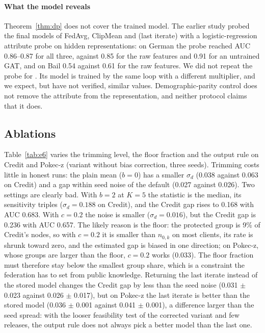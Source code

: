 \paragraph{What the model reveals}
Theorem~\ref{thm:dp} does not cover the trained model. The earlier study probed the final models of FedAvg, ClipMean and \clamp{} (last iterate) with a logistic-regression attribute probe on hidden representations: on German the probe reached AUC 0.86--0.87 for all three, against 0.85 for the raw features and 0.91 for an untrained GAT, and on Bail 0.54 against 0.61 for the raw features. We did not repeat the probe for \rt{}. Its model is trained by the same loop with a different multiplier, and we expect, but have not verified, similar values. Demographic-parity control does not remove the attribute from the representation, and neither protocol claims that it does.

\subsection{Ablations}\label{sec:ablation}



Table~\ref{tab:e6} varies the trimming level, the floor fraction and the output rule on Credit and Pokec-z (variant without bias correction, three seeds). Trimming costs little in honest runs: the plain mean ($b=0$) has a smaller $\sigma_d$ (0.038 against 0.063 on Credit) and a gap within seed noise of the default (0.027 against 0.026). Two settings are clearly bad. With $b=2$ at $K=5$ the statistic is the median, its sensitivity triples ($\sigma_d=0.188$ on Credit), and the Credit gap rises to 0.168 with AUC 0.683. With $c=0.2$ the noise is smaller ($\sigma_d=0.016$), but the Credit gap is 0.236 with AUC 0.657. The likely reason is the floor: the protected group is 9\% of Credit's nodes, so with $c=0.2$ it is smaller than $n_{0,k}$ on most clients, its rate is shrunk toward zero, and the estimated gap is biased in one direction; on Pokec-z, whose groups are larger than the floor, $c=0.2$ works (0.033). The floor fraction must therefore stay below the smallest group share, which is a constraint the federation has to set from public knowledge. Returning the last iterate instead of the stored model changes the Credit gap by less than the seed noise (0.031 $\pm$ 0.023 against 0.026 $\pm$ 0.017), but on Pokec-z the last iterate is better than the stored model (0.036 $\pm$ 0.001 against 0.041 $\pm$ 0.001), a difference larger than the seed spread: with the looser feasibility test of the corrected variant and few releases, the output rule does not always pick a better model than the last one.

